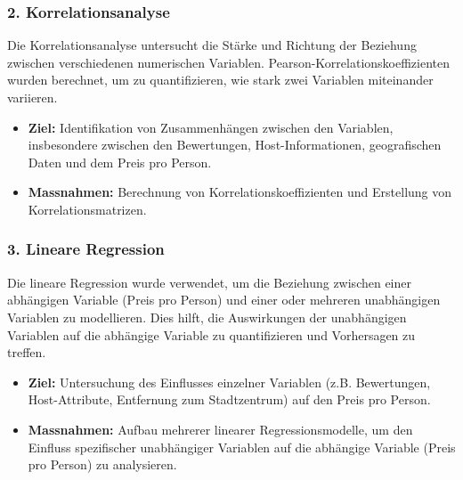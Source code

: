 \documentclass[
  journal,
]{IEEEtran}%
\begin{document}
\subsubsection{\texorpdfstring{2.
\textbf{Korrelationsanalyse}}{2. Korrelationsanalyse}}\label{korrelationsanalyse}

Die Korrelationsanalyse untersucht die Stärke und Richtung der Beziehung
zwischen verschiedenen numerischen Variablen.
Pearson-Korrelationskoeffizienten wurden berechnet, um zu
quantifizieren, wie stark zwei Variablen miteinander variieren.

\begin{itemize}
\item
  \textbf{Ziel:} Identifikation von Zusammenhängen zwischen den
  Variablen, insbesondere zwischen den Bewertungen, Host-Informationen,
  geografischen Daten und dem Preis pro Person.
\item
  \textbf{Massnahmen:} Berechnung von Korrelationskoeffizienten und
  Erstellung von Korrelationsmatrizen.
\end{itemize}

\subsubsection{\texorpdfstring{3. \textbf{Lineare
Regression}}{3. Lineare Regression}}\label{lineare-regression}

Die lineare Regression wurde verwendet, um die Beziehung zwischen einer
abhängigen Variable (Preis pro Person) und einer oder mehreren
unabhängigen Variablen zu modellieren. Dies hilft, die Auswirkungen der
unabhängigen Variablen auf die abhängige Variable zu quantifizieren und
Vorhersagen zu treffen.

\begin{itemize}
\item
  \textbf{Ziel:} Untersuchung des Einflusses einzelner Variablen (z.B.
  Bewertungen, Host-Attribute, Entfernung zum Stadtzentrum) auf den
  Preis pro Person.
\item
  \textbf{Massnahmen:} Aufbau mehrerer linearer Regressionsmodelle, um
  den Einfluss spezifischer unabhängiger Variablen auf die abhängige
  Variable (Preis pro Person) zu analysieren.
\end{itemize}
\end{document}
